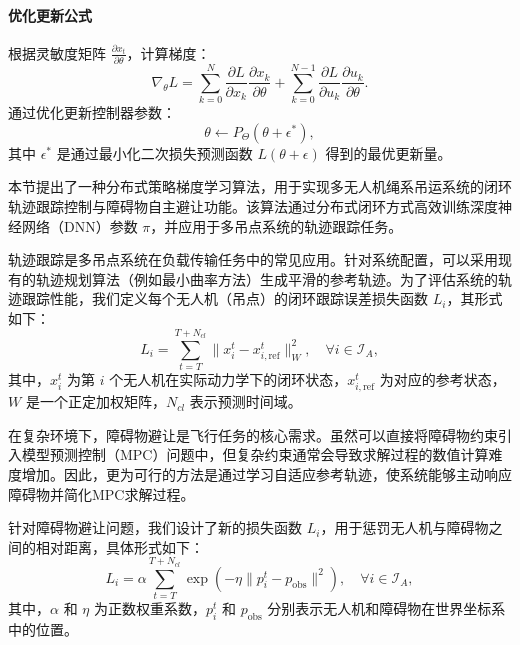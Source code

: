 \documentclass[lang=chs, degree=master, blindreview=false, winfonts=true]{yanputhesis}
\begin{document}
\paragraph{优化更新公式}  
根据灵敏度矩阵 $\frac{\partial x_t}{\partial \theta}$，计算梯度：
\begin{equation}
\nabla_\theta L = \sum_{k=0}^N \frac{\partial L}{\partial x_k} \frac{\partial x_k}{\partial \theta} + \sum_{k=0}^{N-1} \frac{\partial L}{\partial u_k} \frac{\partial u_k}{\partial \theta}.
\end{equation}
通过优化更新控制器参数：
\begin{equation}
\theta \leftarrow P_\Theta(\theta + \epsilon^*),
\end{equation}
其中 $\epsilon^*$ 是通过最小化二次损失预测函数 $L(\theta + \epsilon)$ 得到的最优更新量。

本节提出了一种分布式策略梯度学习算法，用于实现多无人机绳系吊运系统的闭环轨迹跟踪控制与障碍物自主避让功能。该算法通过分布式闭环方式高效训练深度神经网络（DNN）参数 $\pi$，并应用于多吊点系统的轨迹跟踪任务。

轨迹跟踪是多吊点系统在负载传输任务中的常见应用。针对系统配置，可以采用现有的轨迹规划算法（例如最小曲率方法）生成平滑的参考轨迹。为了评估系统的轨迹跟踪性能，我们定义每个无人机（吊点）的闭环跟踪误差损失函数 $L_i$，其形式如下：
\begin{equation}
L_i = \sum_{t=T}^{T+N_{cl}} \| x_i^t - x_{i,\text{ref}}^t \|_W^2, \quad \forall i \in \mathcal{I}_A,  \label{28}
\end{equation}
其中，$x_i^t$ 为第 $i$ 个无人机在实际动力学下的闭环状态，$x_{i,\text{ref}}^t$ 为对应的参考状态，$W$ 是一个正定加权矩阵，$N_{cl}$ 表示预测时间域。

在复杂环境下，障碍物避让是飞行任务的核心需求。虽然可以直接将障碍物约束引入模型预测控制（MPC）问题中，但复杂约束通常会导致求解过程的数值计算难度增加。因此，更为可行的方法是通过学习自适应参考轨迹，使系统能够主动响应障碍物并简化MPC求解过程。

针对障碍物避让问题，我们设计了新的损失函数 $L_i$，用于惩罚无人机与障碍物之间的相对距离，具体形式如下：
\begin{equation}
L_i = \alpha \sum_{t=T}^{T+N_{cl}} \exp\left(-\eta \| p_i^t - p_{\text{obs}} \|^2 \right), \quad \forall i \in \mathcal{I}_A,  
\label{29}
\end{equation}
其中，$\alpha$ 和 $\eta$ 为正数权重系数，$p_i^t$ 和 $p_{\text{obs}}$ 分别表示无人机和障碍物在世界坐标系中的位置。
\end{document}
